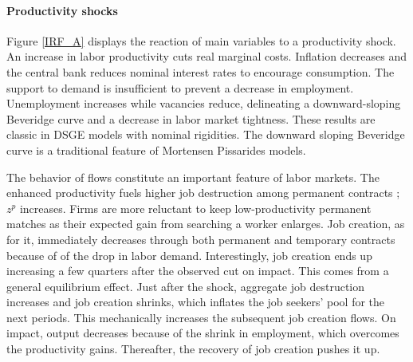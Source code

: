 \documentclass[a4paper]{article}
\begin{document}
\paragraph{Productivity shocks} Figure \ref{IRF_A} displays the reaction of main variables to a productivity shock. An increase in labor productivity cuts real marginal costs. Inflation decreases and the central bank reduces nominal interest rates to encourage consumption. The support to demand is insufficient to prevent a decrease in employment. Unemployment increases while vacancies reduce, delineating a downward-sloping Beveridge curve and a decrease in labor market tightness. These results are classic in DSGE models with nominal rigidities. The downward sloping Beveridge curve is a traditional feature of Mortensen Pissarides models.

The behavior of flows constitute an important feature of labor markets. The enhanced productivity fuels higher job destruction among permanent contracts ; $z^p$ increases. Firms are more reluctant to keep low-productivity permanent matches as their expected gain from searching a worker enlarges. Job creation, as for it, immediately decreases through both permanent and temporary contracts because of of the drop in labor demand. Interestingly, job creation ends up increasing a few quarters after the observed cut on impact. This comes from a general equilibrium effect. Just after the shock, aggregate job destruction increases and job creation shrinks, which inflates the job seekers' pool for the next periods. This mechanically increases the subsequent job creation flows. On impact, output decreases because of the shrink in employment, which overcomes the productivity gains. Thereafter, the recovery of job creation pushes it up. 
\end{document}
